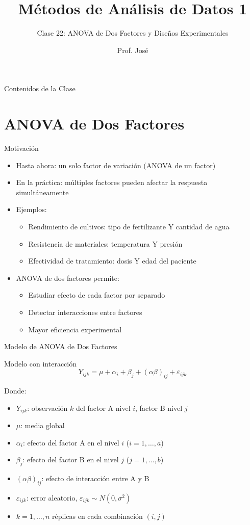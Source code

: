 \documentclass[aspectratio=169]{beamer}
\title[MAD1 - Clase 22]{Métodos de Análisis de Datos 1}
\subtitle{Clase 22: ANOVA de Dos Factores y Diseños Experimentales}
\author{Prof. José}
\institute{Departamento de Matemática \\ Universidad Nacional del Sur}
\date{}
\begin{document}
\begin{frame}
\titlepage
\end{frame}

\begin{frame}{Contenidos de la Clase}
\tableofcontents
\end{frame}

\section{ANOVA de Dos Factores}

\begin{frame}{Motivación}
\begin{itemize}
\item Hasta ahora: un solo factor de variación (ANOVA de un factor)
\item En la práctica: múltiples factores pueden afectar la respuesta simultáneamente
\item Ejemplos:
\begin{itemize}
\item Rendimiento de cultivos: tipo de fertilizante Y cantidad de agua
\item Resistencia de materiales: temperatura Y presión
\item Efectividad de tratamiento: dosis Y edad del paciente
\end{itemize}
\item ANOVA de dos factores permite:
\begin{itemize}
\item Estudiar efecto de cada factor por separado
\item Detectar interacciones entre factores
\item Mayor eficiencia experimental
\end{itemize}
\end{itemize}
\end{frame}

\begin{frame}{Modelo de ANOVA de Dos Factores}
\begin{block}{Modelo con interacción}
$$Y_{ijk} = \mu + \alpha_i + \beta_j + (\alpha\beta)_{ij} + \varepsilon_{ijk}$$
\end{block}

Donde:
\begin{itemize}
\item $Y_{ijk}$: observación $k$ del factor A nivel $i$, factor B nivel $j$
\item $\mu$: media global
\item $\alpha_i$: efecto del factor A en el nivel $i$ ($i=1,\ldots,a$)
\item $\beta_j$: efecto del factor B en el nivel $j$ ($j=1,\ldots,b$)
\item $(\alpha\beta)_{ij}$: efecto de interacción entre A y B
\item $\varepsilon_{ijk}$: error aleatorio, $\varepsilon_{ijk} \sim N(0,\sigma^2)$
\item $k=1,\ldots,n$ réplicas en cada combinación $(i,j)$
\end{itemize}
\end{frame}
\end{document}
